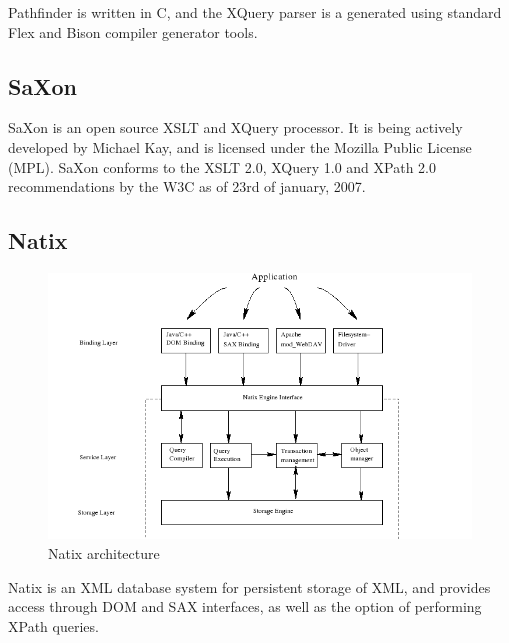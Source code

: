 Pathfinder is written in C, and the XQuery parser is a generated using standard Flex and Bison compiler generator tools.

\subsection{SaXon}
SaXon is an open source XSLT and XQuery processor. It is being actively developed by Michael Kay, and is licensed under the Mozilla Public License (MPL). SaXon conforms to the XSLT 2.0, XQuery 1.0 and XPath 2.0 recommendations by the W3C as of 23rd of january, 2007.

\subsection{Natix}
\begin{figure}[!h]
  \centering
    \includegraphics[width=1\textwidth]{img/natix_architecture.png}
  \caption{Natix architecture}
\end{figure}
Natix is an XML database system for persistent storage of XML, and provides access through DOM and SAX interfaces, as well as the option of performing XPath queries.